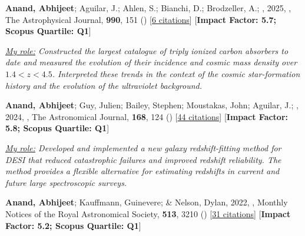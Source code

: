 \item[{\color{numcolor}\scriptsize5}] \textbf{Anand, Abhijeet}; Aguilar, J.; Ahlen, S.; Bianchi, D.; Brodzeller, A.; \etal, 2025, , The Astrophysical Journal, \textbf{990}, 151 () [\href{https://ui.adsabs.harvard.edu/abs/2025ApJ...990..151A}{6 citations}] [\textbf{Impact Factor: 5.7; Scopus Quartile: Q1}]

\vspace{1mm}
\item\textit{\underline{My role:} Constructed the largest catalogue of triply ionized carbon absorbers to date and measured the evolution of their incidence and cosmic mass density over $1.4<z<4.5$.  Interpreted these trends in the context of the cosmic star-formation history and the evolution of the ultraviolet background.}
\vspace{1mm}

\item[{\color{numcolor}\scriptsize4}] \textbf{Anand, Abhijeet}; Guy, Julien; Bailey, Stephen; Moustakas, John; Aguilar, J.; \etal, 2024, , The Astronomical Journal, \textbf{168}, 124 () [\href{https://ui.adsabs.harvard.edu/abs/2024AJ....168..124A}{44 citations}] [\textbf{Impact Factor: 5.8; Scopus Quartile: Q1}]

\vspace{1mm}
\item\textit{\underline{My role:} Developed and implemented a new galaxy redshift-fitting method for DESI that reduced catastrophic failures and improved redshift reliability. The method provides a flexible alternative for estimating redshifts in current and future large spectroscopic surveys.}
\vspace{1mm}

\item[{\color{numcolor}\scriptsize3}] \textbf{Anand, Abhijeet}; Kauffmann, Guinevere; \& Nelson, Dylan, 2022, , Monthly Notices of the Royal Astronomical Society, \textbf{513}, 3210 () [\href{https://ui.adsabs.harvard.edu/abs/2022MNRAS.513.3210A}{31 citations}] [\textbf{Impact Factor: 5.2; Scopus Quartile: Q1}]

